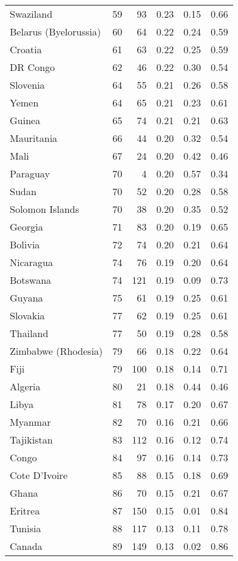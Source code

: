 \begin{longtable}[t]{lrrrrr}
Swaziland & 59 & 93 & 0.23 & 0.15 & 0.66\\
Belarus (Byelorussia) & 60 & 64 & 0.22 & 0.24 & 0.59\\
\addlinespace
Croatia & 61 & 63 & 0.22 & 0.25 & 0.59\\
DR Congo & 62 & 46 & 0.22 & 0.30 & 0.54\\
Slovenia & 64 & 55 & 0.21 & 0.26 & 0.58\\
Yemen & 64 & 65 & 0.21 & 0.23 & 0.61\\
Guinea & 65 & 74 & 0.21 & 0.21 & 0.63\\
\addlinespace
Mauritania & 66 & 44 & 0.20 & 0.32 & 0.54\\
Mali & 67 & 24 & 0.20 & 0.42 & 0.46\\
Paraguay & 70 & 4 & 0.20 & 0.57 & 0.34\\
Sudan & 70 & 52 & 0.20 & 0.28 & 0.58\\
Solomon Islands & 70 & 38 & 0.20 & 0.35 & 0.52\\
\addlinespace
Georgia & 71 & 83 & 0.20 & 0.19 & 0.65\\
Bolivia & 72 & 74 & 0.20 & 0.21 & 0.64\\
Nicaragua & 74 & 76 & 0.19 & 0.20 & 0.64\\
Botswana & 74 & 121 & 0.19 & 0.09 & 0.73\\
Guyana & 75 & 61 & 0.19 & 0.25 & 0.61\\
\addlinespace
Slovakia & 77 & 62 & 0.19 & 0.25 & 0.61\\
Thailand & 77 & 50 & 0.19 & 0.28 & 0.58\\
Zimbabwe (Rhodesia) & 79 & 66 & 0.18 & 0.22 & 0.64\\
Fiji & 79 & 100 & 0.18 & 0.14 & 0.71\\
Algeria & 80 & 21 & 0.18 & 0.44 & 0.46\\
\addlinespace
Libya & 81 & 78 & 0.17 & 0.20 & 0.67\\
Myanmar & 82 & 70 & 0.16 & 0.21 & 0.66\\
Tajikistan & 83 & 112 & 0.16 & 0.12 & 0.74\\
Congo & 84 & 97 & 0.16 & 0.14 & 0.73\\
Cote D'Ivoire & 85 & 88 & 0.15 & 0.18 & 0.69\\
\addlinespace
Ghana & 86 & 70 & 0.15 & 0.21 & 0.67\\
Eritrea & 87 & 150 & 0.15 & 0.01 & 0.84\\
Tunisia & 88 & 117 & 0.13 & 0.11 & 0.78\\
Canada & 89 & 149 & 0.13 & 0.02 & 0.86\\

\end{longtable}
